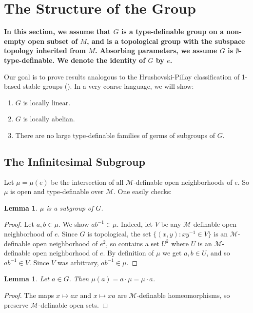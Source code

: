 \documentclass{amsart}
\newtheorem{lemma}[theorem]{Lemma}
\theoremstyle{definition}
\begin{document}
\section{The Structure of the Group}

\textbf{In this section, we assume that $G$ is a type-definable group on a non-empty open subset of $M$, and is a topological group with the subspace topology inherited from $M$. Absorbing parameters, we assume $G$ is $\emptyset$-type-definable. We denote the identity of $G$ by $e$.}

Our goal is to prove results analogous to the Hrushovski-Pillay classification of 1-based stable groups (\cite{HrPi87}). In a very coarse language, we will show:

\begin{enumerate}
    \item $G$ is locally linear.
    \item $G$ is locally abelian.
    \item There are no large type-definable families of germs of subgroups of $G$.
\end{enumerate}

\subsection{The Infinitesimal Subgroup}

Let $\mu=\mu(e)$ be the intersection of all $\mathcal M$-definable open neighborhoods of $e$. So $\mu$ is open and type-definable over $\mathcal M$. One easily checks:

\begin{lemma}\label{L: mu subgroup}
    $\mu$ is a subgroup of $G$.
\end{lemma}
\begin{proof}
    Let $a,b\in\mu$. We show $ab^{-1}\in\mu$. Indeed, let $V$ be any $\mathcal M$-definable open neighborhood of $e$. Since $G$ is topological, the set $\{(x,y):xy^{-1}\in V\}$ is an $\mathcal M$-definable open neighborhood of $e^2$, so contains a set $U^2$ where $U$ is an $\mathcal M$-definable open neighborhood of $e$. By definition of $\mu$ we get $a,b\in U$, and so $ab^{-1}\in V$. Since $V$ was arbitrary, $ab^{-1}\in\mu$. 
\end{proof}

\begin{lemma}\label{L: mu translation}
    Let $a\in G$. Then $\mu(a)=a\cdot\mu=\mu\cdot a$.
\end{lemma}
\begin{proof}
    The maps $x\mapsto ax$ and $x\mapsto xa$ are $\mathcal M$-definable homeomorphisms, so preserve $\mathcal M$-definable open sets.
\end{proof}
\end{document}
